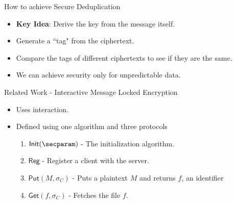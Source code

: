 \documentclass{beamer}
\newcommand{\client}{\sigma_C}
\begin{document}
%
%
\begin{frame}{How to achieve Secure Deduplication}
	\begin{itemize}
		\setlength\itemsep{1em}
		\item \textbf{Key Idea}: Derive the key from the message itself.
		\item Generate a ``tag" from the ciphertext.
		\item Compare the tags of different ciphertexts to see if they are the same.
		\item We can achieve security only for unpredictable data.
	\end{itemize}
\end{frame}
%

\begin{frame}{Related Work - Interactive Message Locked Encryption}
	\begin{itemize}
		\setlength\itemsep{1em}
		\item Uses interaction.
		\item Defined using one algorithm and three protocols
		\begin{enumerate}
		    \item $\mathsf{Init}(\secparam)$ - The initialization algorithm.
		    \item $\mathsf{Reg}$ - Register a client with the server.
		    \item $\mathsf{Put}(M, \client)$ - Puts a plaintext $M$ and returns $f$, an identifier
		    \item $\mathsf{Get}(f, \client)$ - Fetches the file $f$.
		\end{enumerate}
	\end{itemize}
\end{frame}
\end{document}
